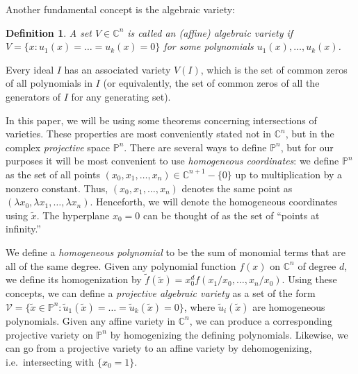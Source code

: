 \documentclass[aps,pra,notitlepage,preprintnumbers,11pt,tightenlines]{revtex4-1}
\newcommand{\CC}{\mathbb{C}}
\newcommand{\PP}{\mathbb{P}}
\newcommand{\VV}{\mathcal{V}}
\newtheorem{definition}[theorem]{Definition}
\begin{document}
Another fundamental concept is the algebraic variety:
\begin{definition}
A set $V \in \CC^n$ is called an \emph{(affine)
  algebraic variety} if $V = \{ x: u_1(x) = \dots = u_k(x) = 0\}$ for
some polynomials $u_1(x), \dots, u_k(x)$.
\end{definition}

Every ideal $I$ has an associated
variety $V(I)$, which is the set of common zeros of all polynomials in
$I$ (or equivalently, the set of common zeros of all the generators of
$I$ for any generating set). 


In this paper, we will be using some theorems concerning intersections of
varieties. These properties are most conveniently stated not in
$\CC^n$, but in the complex \emph{projective} space $\PP^n$. There are
several ways to define $\PP^n$, but for our purposes it will be most
convenient to use \emph{homogeneous coordinates}: we define $\PP^n$ as the
set of all points $(x_0, x_1, \dots, x_n) \in
\CC^{n+1} - \{0\}$ up to multiplication by a nonzero constant. Thus,
$(x_0, x_1, \dots, x_n)$ denotes the same point as $(\lambda x_0,
\lambda x_1, \dots, \lambda x_n)$. Henceforth, we will denote the
homogeneous coordinates using $\tilde{x}$. The hyperplane $x_0 = 0$
can be thought of as the set of ``points at infinity.'' 

We define a \emph{homogeneous polynomial} to be the sum of monomial
terms that are all of the same degree. Given any polynomial function
$f(x)$ on $\CC^n$ of degree $d$, we define its homogenization by
$\tilde{f}(\tilde{x}) = x_0^d f(x_1/x_0, \dots, x_n/x_0)$. Using these
concepts, we can define a
\emph{projective algebraic variety} as a set of the form $\VV = \{ \tilde{x} \in
\PP^n : \tilde{u}_1(\tilde{x}) = \dots = \tilde{u}_k(\tilde{x}) =
0\}$, where $\tilde{u}_i(\tilde{x})$ are homogeneous polynomials. Given any affine variety in $\CC^n$, we can
produce a corresponding projective variety on $\PP^n$ by homogenizing the
defining polynomials. Likewise, we can go from a projective variety to
an affine variety by dehomogenizing, i.e.~intersecting with $\{x_0 =
1\}$. 
\end{document}
